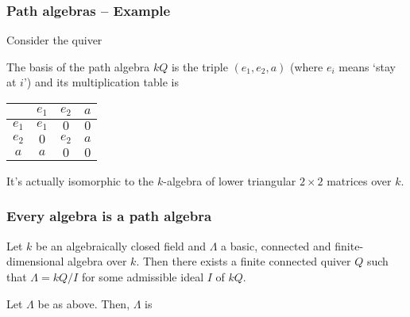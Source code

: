 \begin{frame}[fragile]
 \frametitle{Path algebras -- Example}
 Consider the quiver
 \begin{figure}[h]
  \centering
 \end{figure}

 \pause
 The basis of the path algebra $kQ$ is the triple $(e_1,e_2,a)$ (where $e_i$
 means `stay at $i$') and its multiplication table is
 \begin{table}[h]
  \centering
  \begin{tabular}{c|ccc}
   & $e_1$ & $e_2$ & $a$ \\
   \toprule
   $e_1$ & $e_1$ & $0$ & $0$\\
   $e_2$ & $0$ & $e_2$ & $a$\\
   $a$ & $a$ & $0$ & $0$
  \end{tabular}
 \end{table}

 \pause

 It's actually isomorphic to the $k$-algebra of lower triangular $2 \times 2$
 matrices over $k$.
\end{frame}

\begin{frame}
 \frametitle{Every algebra is a path algebra}
 \begin{theorem}
 	Let $k$ be an algebraically closed field and $\Lambda$ a basic, connected and
 	finite-dimensional algebra over $k$. Then there exists a finite connected
 	quiver $Q$ such that $\Lambda = kQ / I$ for some admissible ideal $I$ of $kQ$.
 \end{theorem}
 \pause
 \begin{theorem}[Gabriel's]
 	Let $\Lambda$ be as above. Then, $\Lambda$ is 
 \end{theorem}
\end{frame}

